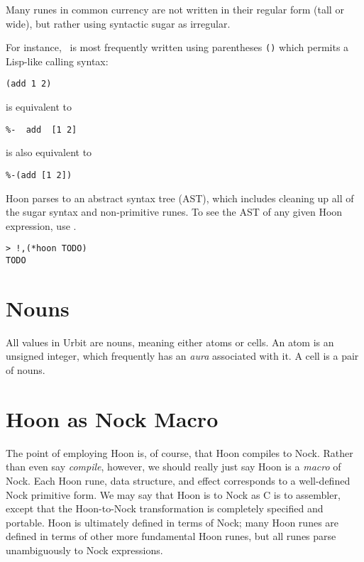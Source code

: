 Many runes in common currency are not written in their regular form (tall or wide), but rather using syntactic sugar as irregular.

For instance, \pcenhep~is most frequently written using parentheses \texttt{()} which permits a Lisp-like calling syntax:

\begin{lstlisting}
(add 1 2)
\end{lstlisting}

is equivalent to

\begin{lstlisting}
%-  add  [1 2]
\end{lstlisting}

is also equivalent to

\begin{lstlisting}
%-(add [1 2])
\end{lstlisting}



Hoon parses to an abstract syntax tree (AST), which includes cleaning up all of the sugar syntax and non-primitive runes.  To see the AST of any given Hoon expression, use \pzapcom.

\begin{lstlisting}[style=nonumbers]
> !,(*hoon TODO)
TODO
\end{lstlisting}

\section{Nouns}

All values in Urbit are nouns, meaning either atoms or cells.  An atom is an unsigned integer, which frequently has an \emph{aura} associated with it.  A cell is a pair of nouns.


\section{Hoon as Nock Macro}

The point of employing Hoon is, of course, that Hoon compiles to Nock.  Rather than even say \emph{compile}, however, we should really just say Hoon is a \emph{macro} of Nock.  Each Hoon rune, data structure, and effect corresponds to a well-defined Nock primitive form.  We may say that Hoon is to Nock as C is to assembler, except that the Hoon-to-Nock transformation is completely specified and portable.  Hoon is ultimately defined in terms of Nock; many Hoon runes are defined in terms of other more fundamental Hoon runes, but all runes parse unambiguously to Nock expressions.


